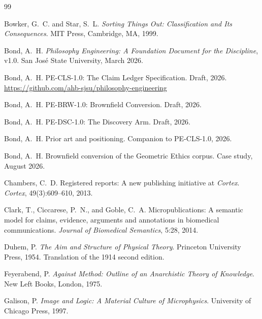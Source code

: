 \documentclass[11pt,letterpaper]{article}
\begin{document}
\begin{thebibliography}{99}
\small

Bowker, G.~C. and Star, S.~L.
\newblock \emph{Sorting Things Out: Classification and Its Consequences}.
\newblock MIT Press, Cambridge, MA, 1999.

Bond, A.~H.
\newblock \emph{Philosophy Engineering: A Foundation Document for the
Discipline}, v1.0.
\newblock San Jos\'{e} State University, March 2026.

Bond, A.~H.
\newblock PE-CLS-1.0: The Claim Ledger Specification. Draft, 2026.
\newblock \url{https://github.com/ahb-sjsu/philosophy-engineering}

Bond, A.~H.
\newblock PE-BRW-1.0: Brownfield Conversion. Draft, 2026.

Bond, A.~H.
\newblock PE-DSC-1.0: The Discovery Arm. Draft, 2026.

Bond, A.~H.
\newblock Prior art and positioning. Companion to PE-CLS-1.0, 2026.

Bond, A.~H.
\newblock Brownfield conversion of the Geometric Ethics corpus. Case study,
August 2026.

Chambers, C.~D.
\newblock Registered reports: A new publishing initiative at \emph{Cortex}.
\newblock \emph{Cortex}, 49(3):609--610, 2013.

Clark, T., Ciccarese, P.~N., and Goble, C.~A.
\newblock Micropublications: A semantic model for claims, evidence, arguments
and annotations in biomedical communications.
\newblock \emph{Journal of Biomedical Semantics}, 5:28, 2014.

Duhem, P.
\newblock \emph{The Aim and Structure of Physical Theory}.
\newblock Princeton University Press, 1954. Translation of the 1914 second
edition.

Feyerabend, P.
\newblock \emph{Against Method: Outline of an Anarchistic Theory of Knowledge}.
\newblock New Left Books, London, 1975.

Galison, P.
\newblock \emph{Image and Logic: A Material Culture of Microphysics}.
\newblock University of Chicago Press, 1997.


\end{thebibliography}
\end{document}
